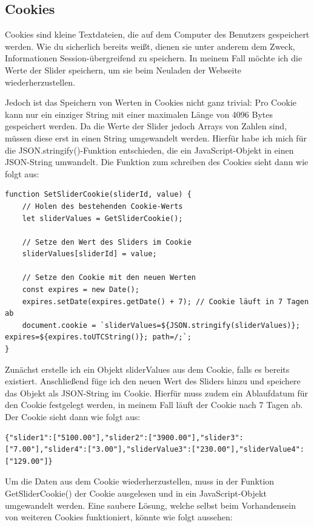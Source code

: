 \subsection{Cookies}

Cookies sind kleine Textdateien, die auf dem Computer des Benutzers gespeichert werden. Wie du sicherlich bereits weißt, dienen sie unter anderem dem Zweck, Informationen Session-übergreifend zu speichern. In meinem Fall möchte ich die Werte der Slider speichern, um sie beim Neuladen der Webseite wiederherzustellen.

Jedoch ist das Speichern von Werten in Cookies nicht ganz trivial: Pro Cookie kann nur ein einziger String mit einer maximalen Länge von 4096 Bytes gespeichert werden. Da die Werte der Slider jedoch Arrays von Zahlen sind, müssen diese erst in einen String umgewandelt werden. Hierfür habe ich mich für die JSON.stringify()-Funktion entschieden, die ein JavaScript-Objekt in einen JSON-String umwandelt. Die Funktion zum schreiben des Cookies sieht dann wie folgt aus:

\begin{lstlisting}[style=JavaScript]
function SetSliderCookie(sliderId, value) {
    // Holen des bestehenden Cookie-Werts
    let sliderValues = GetSliderCookie();

    // Setze den Wert des Sliders im Cookie
    sliderValues[sliderId] = value;

    // Setze den Cookie mit den neuen Werten
    const expires = new Date();
    expires.setDate(expires.getDate() + 7); // Cookie läuft in 7 Tagen ab
    document.cookie = `sliderValues=${JSON.stringify(sliderValues)}; expires=${expires.toUTCString()}; path=/;`;
}
\end{lstlisting}

Zunächst erstelle ich ein Objekt \glqq sliderValues\grqq{} aus dem Cookie, falls es bereits existiert. Anschließend füge ich den neuen Wert des Sliders hinzu und speichere das Objekt als JSON-String im Cookie. Hierfür muss zudem ein Ablaufdatum für den Cookie festgelegt werden, in meinem Fall läuft der Cookie nach 7 Tagen ab. Der Cookie sieht dann wie folgt aus:

\begin{lstlisting}[style=JavaScript]
{"slider1":["5100.00"],"slider2":["3900.00"],"slider3":["7.00"],"slider4":["3.00"],"sliderValue3":["230.00"],"sliderValue4":["129.00"]}
\end{lstlisting}

Um die Daten aus dem Cookie wiederherzustellen, muss in der Funktion GetSliderCookie() der Cookie ausgelesen und in ein JavaScript-Objekt umgewandelt werden. Eine saubere Lösung, welche selbst beim Vorhandensein von weiteren Cookies funktioniert, könnte wie folgt aussehen:


